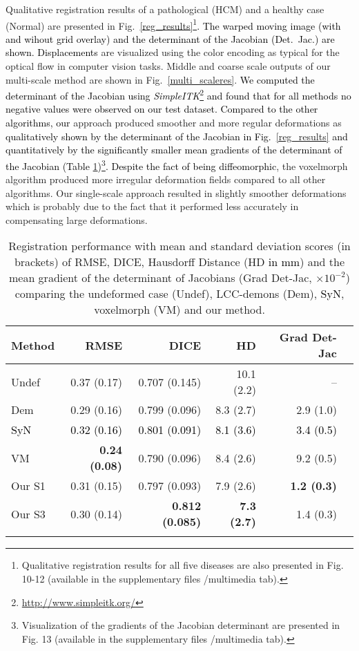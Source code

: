 \documentclass[journal]{IEEEtran}
\newcommand{\update}[1]{\textcolor{black}{#1}}
\begin{document}
Qualitative registration results of a pathological (HCM) and a healthy case (Normal) are presented in Fig.\ \ref{reg_results}\update{\footnote{Qualitative registration results for all five diseases are also presented in Fig. 10-12 (available in the supplementary files /multimedia tab).}. The warped moving image (with and wihout grid overlay) and  the determinant of the Jacobian (Det.~Jac.) are shown. Displacements} are visualized using the color encoding as typical for the optical flow in computer vision tasks. Middle and coarse scale outputs of our multi-scale method are shown in Fig.~\ref{multi_scaleres}. \update{We computed the determinant of the Jacobian using \emph{SimpleITK}\footnote{\update{\url{http://www.simpleitk.org/}}} and found that for all methods no negative values were observed on our test dataset. Compared to the other algorithms, our} approach produced smoother and more regular deformations as \update{qualitatively shown by the determinant of the Jacobian in Fig.~\ref{reg_results} and quantitatively by the significantly smaller mean gradients of the determinant of the Jacobian (Table \ref{resultTable})\update{\footnote{Visualization of the gradients of the Jacobian determinant are presented in Fig. 13 (available in the supplementary files /multimedia tab).}}. Despite the fact of being diffeomorphic}, the voxelmorph algorithm produced more irregular deformation fields compared to all other algorithms. Our single-scale approach resulted in slightly smoother deformations which is probably due to the fact that it performed less accurately in compensating large deformations. 

\begin{table}[ht]
\centering
\caption{\small{Registration performance with mean and standard deviation scores (in brackets) of RMSE, DICE, Hausdorff Distance (HD \update{in mm}) and the mean gradient of the determinant of Jacobians (Grad Det-Jac, $\times 10^{-2}$) comparing the undeformed case (Undef), LCC-demons (Dem), \update{SyN}, voxelmorph (VM) and our method.}}\label{resultTable}
\begin{tabular}{l|rrrrr}
Method & RMSE & DICE & HD & Grad Det-Jac \\
\hline
Undef & 0.37 (0.17) & 0.707 (0.145) & 10.1 (2.2) & --\\ Dem & 0.29 (0.16) & 0.799 (0.096) & 8.3 (2.7) & 2.9 (1.0) \\ \update{SyN} & \update{0.32 (0.16)} &\update{0.801 (0.091)} & \update{8.1 (3.6)} &\update{3.4 (0.5)} \\
VM & \bf{0.24 (0.08)} & 0.790 (0.096) & 8.4 (2.6) & 9.2 (0.5) \\ Our S1 & 0.31 (0.15) & 0.797 (0.093) & 7.9 (2.6) & \bf{1.2 (0.3)} \\ Our S3 & 0.30 (0.14) & \bf{0.812 (0.085)} & \bf{7.3 (2.7)} & 1.4 (0.3)\\ \noalign{\smallskip}
\hline
\end{tabular}
\end{table}
\end{document}
